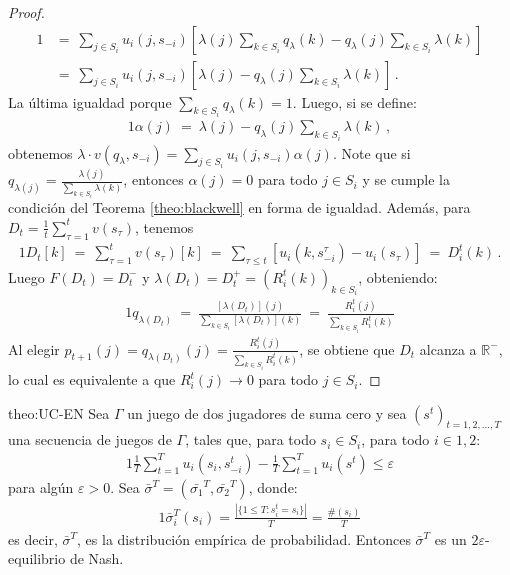 \begin{proof}
\begin{alignat}{1}
	&=\ \sum_{j \in S_i} u_i(j, s_{-i}) \left[ \lambda(j) \sum_{k \in S_i} q_{\lambda}(k)  - q_{\lambda}(j) \sum_{k \in S_i} \lambda(k)  \right] \\
	&=\ \sum_{j \in S_i} u_i(j, s_{-i}) \left[ \lambda(j) - q_{\lambda}(j) \sum_{k \in S_i} \lambda(k) \right] \,.
\end{alignat}
La última igualdad porque $\sum_{k\in S_i} q_{\lambda}(k)=1$. Luego, si se define:
\begin{alignat}{1}
	\alpha(j)\ =\ \lambda(j) - q_{\lambda}(j) \sum_{k \in S_i} \lambda(k) \,,
\end{alignat}
obtenemos $\lambda \cdot v(q_{\lambda}, s_{-i}) = \sum_{j \in S_i} u_i(j, s_{-i})\alpha(j)$.
Note que si $q_{\lambda(j)} = \frac{\lambda(j)}{\sum_{k \in S_i} \lambda(k)}$, entonces $\alpha(j) = 0$ para todo $j \in S_i$ y se cumple la condición del Teorema \ref{theo:blackwell} en forma de igualdad. Además, para $D_t=\frac{1}{t} \sum_{\tau = 1}^{t} v(s_{\tau})$, tenemos
\begin{alignat}{1}
	D_t[k]\ =\ \sum_{\tau = 1}^{t} v(s_{\tau})[k]\ =\ \sum_{\tau \leq t }[u_i(k, s_{-i}^{\tau}) - u_i(s_{\tau})]\ =\  D_i^t(k) \,.
\end{alignat}
Luego $F(D_t) = D_t^-$ y $\lambda(D_t) = D_t^+ = (R_i^t(k))_{k \in S_i}$, obteniendo:
\begin{alignat}{1}
	q_{\lambda(D_t)}\ =\ \frac{[\lambda(D_t)](j)}{\sum_{k \in S_i}[\lambda(D_t)](k)}\ =\ \frac{R_i^t(j)}{\sum_{k \in S_i} R_i^t(k)}
\end{alignat}
Al elegir $p_{t+1}(j) = q_{\lambda(D_t)}(j) = \frac{R_i^t (j)}{\sum_{k \in S_i} R_i^t(k)}$, se obtiene que $D_t$ alcanza a $\mathbb{R^-}$, lo cual es equivalente a que $R_i^t(j) \rightarrow 0$ para todo $j \in S_i$.
\end{proof}


\begin{reptheorem}{theo:UC-EN}
Sea $\Gamma$ un juego de dos jugadores de suma cero y sea $(s^t)_{t=1,2,..., T}$ una secuencia de juegos de $\Gamma$, tales que, para todo $s_i \in S_i$, para todo $i \in {1, 2}$:
\begin{alignat}{1}
\frac{1}{T}\sum_{t = 1}^{T}u_i(s_i, s_{-i}^t) - \frac{1}{T} \sum_{t = 1}^T u_i(s^t) \leq \varepsilon
\end{alignat}
para algún $\varepsilon > 0$. Sea $\bar{\sigma}^T = (\bar{\sigma_1}^T, \bar{\sigma_2}^T)$, donde:
\begin{alignat}{1}
\bar{\sigma}_i^T(s_i) = \frac{ |\{ 1 \leq T : s_i^t = s_i\}|}{T} = \frac{\#(s_i)}{T}
\end{alignat}
es decir, $\bar{\sigma}^T$, es la distribución empírica de probabilidad. Entonces $\bar{\sigma}^T$ es un $2\varepsilon$-equilibrio de Nash.
\end{reptheorem}

